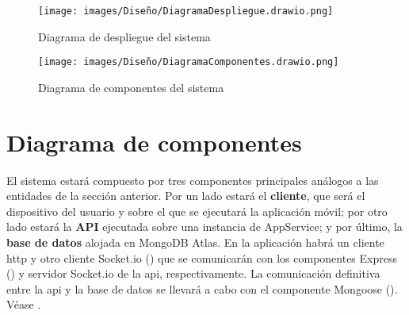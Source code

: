 \begin{figure}[H]
    \centering
    \texttt{[image: images/Diseño/DiagramaDespliegue.drawio.png]}
    \caption{Diagrama de despliegue del sistema}
    \label{fig:diagrama_despliegue}
\end{figure}

\begin{figure}[H]
    \centering
    \texttt{[image: images/Diseño/DiagramaComponentes.drawio.png]}
    \caption{Diagrama de componentes del sistema}
    \label{fig:diagrama_componentes}
\end{figure}

\section{Diagrama de componentes}

El sistema estará compuesto por tres componentes principales análogos a las entidades de la sección anterior. Por un lado estará el \textbf{cliente}, que será el dispositivo del usuario y sobre el que se ejecutará la aplicación móvil; por otro lado estará la \textbf{API} ejecutada sobre una instancia de AppService; y por último, la \textbf{base de datos} alojada en MongoDB Atlas. En la aplicación habrá un cliente \acrshort{http} y otro cliente Socket.io () que se comunicarán con los componentes Express () y servidor Socket.io de la \acrshort{api}, respectivamente. La comunicación definitiva entre la \acrshort{api} y la base de datos se llevará a cabo con el componente Mongoose (). Véase .
